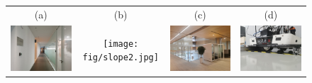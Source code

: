 \documentclass[conference]{IEEEtran}
\begin{document}
\begin{figure}
\begin{center}
\begin{tabular}{cccc}
				\\
				(a) & (b) & (c) & (d)\\
				\includegraphics[scale=0.024]{fig/corridor.jpg} &
				\texttt{[image: fig/slope2.jpg]} &
				\includegraphics[scale=0.024]{fig/loop.jpg}&
				\includegraphics[scale=0.024]{fig/static.jpg}
				

\end{tabular}
\end{center}
\end{figure}
\end{document}
